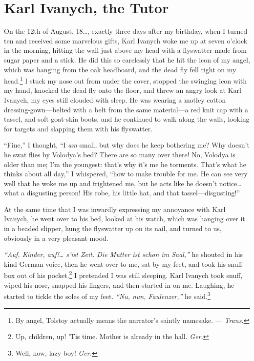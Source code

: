 
\chapter{Karl Ivanych, the Tutor} %

On the 12th of August, 18\ldots{}, exactly three days after my birthday, when I turned ten and received some marvelous gifts, Karl Ivanych woke me up at seven o'clock in the morning, hitting the wall just above my head with a flyswatter made from sugar paper and a stick. He did this so carelessly that he hit the icon of my angel, which was hanging from the oak headboard, and the dead fly fell right on my head.\footnote{\label{ftn:angel}By angel, Tolstoy actually means the narrator's saintly namesake. --- \textit{Trans.}} I stuck my nose out from under the cover, stopped the swinging icon with my hand, knocked the dead fly onto the floor, and threw an angry look at Karl Ivanych, my eyes still clouded with sleep. He was wearing a motley cotton dressing-gown---belted with a belt from the same material---a red knit cap with a tassel, and soft goat-skin boots, and he continued to walk along the walls, looking for targets and slapping them with his flyswatter.

``Fine,'' I thought, ``I \emph{am} small, but why does he keep bothering me? Why doesn't he swat flies by Volodya's bed? There are so many over there! No, Volodya is older than me; I'm the youngest: that's why it's me he torments. That's what he thinks about all day,'' I whispered, ``how to make trouble for me. He can see very well that he woke me up and frightened me, but he acts like he doesn't notice\ldots{} what a disgusting person! His robe, his little hat, and that tassel---disgusting!'' %

At the same time that I was inwardly expressing my annoyance with Karl Ivanych, he went over to his bed, looked at his watch, which was hanging over it in a beaded slipper, hung the flyswatter up on its nail, and turned to us, obviously in a very pleasant mood.

\textit{``Auf, Kinder, auf!\ldots{} s'ist Zeit. Die Mutter ist schon im Saal,''} he shouted in his kind German voice, then he went over to me, sat by my feet, and took his snuff box out of his pocket.\footnote{Up, children, up! 'Tis time. Mother is already in the hall. \textit{Ger.}} I pretended I was still sleeping. Karl Ivanych took snuff, wiped his nose, snapped his fingers, and then started in on me. Laughing, he started to tickle the soles of my feet. \textit{``Nu, nun, Faulenzer,''} he said.\footnote{Well, now, lazy boy! \textit{Ger.}} %

